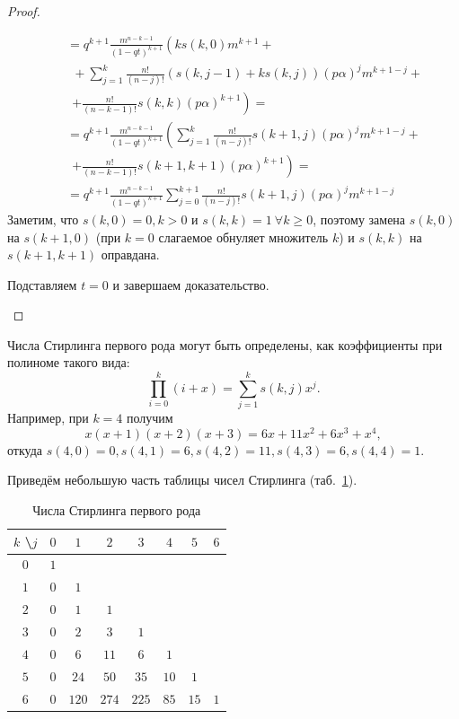 \documentclass[12pt, specialist, subf, substylefile = spbu.rtx]{disser}
\begin{document}
\begin{proof}
\begin{enumerate}
\[\begin{aligned}
					&\quad= q ^{k + 1} \frac {m ^{n - k - 1}} {(1 - qt) ^{k + 1}} \left(k s(k, 0) m ^{k + 1} +\right.\\
					&\quad~~ + \sum \limits ^k _{j = 1} \frac {n !} {(n - j)!} (s(k, j - 1) + k s(k, j)) (p \alpha) ^j m ^{k + 1 - j} +\\
					&\quad~~ \left. +\frac {n !} {(n - k - 1)!} s(k, k) (p \alpha) ^{k + 1}\right)=\\
					&\quad= q ^{k + 1} \frac {m ^{n - k - 1}} {(1 - qt) ^{k + 1}} \left(\sum \limits ^k _{j = 1} \frac {n !} {(n - j)!} s(k + 1, j) (p \alpha) ^j m ^{k + 1 - j} + \right.\\
					&\quad~~ \left. +\frac {n !} {(n - k - 1)!} s(k + 1, k + 1) (p \alpha) ^{k + 1}\right)=\\
					&\quad= q ^{k + 1} \frac {m ^{n - k - 1}} {(1 - qt) ^{k + 1}} \sum \limits ^{k + 1} _{j = 0} \frac {n !} {(n - j)!} s(k + 1, j) (p \alpha) ^j m ^{k + 1 - j}
				\end{aligned}
			\]
			Заметим, что $s(k, 0) = 0, k > 0$ и $s(k, k) = 1~ \forall k \geqslant 0$, поэтому замена $s(k, 0)$ на $s(k + 1, 0)$ (при $k = 0$ слагаемое обнуляет множитель $k$) и $s(k, k)$ на $s(k + 1, k + 1)$ оправдана.
			
			Подставляем $t = 0$ и завершаем доказательство.
		\end{enumerate}
	\end{proof}

	Числа Стирлинга первого рода могут быть определены, как коэффициенты при полиноме такого вида:
	\[
		\prod \limits ^k _{i = 0} (i + x) = \sum \limits ^k _{j = 1} s(k, j) x ^j.
	\]
	Например, при $ k = 4 $ получим
	\[
		x(x + 1)(x + 2)(x + 3) = 6x + 11x ^2 + 6x ^3 + x ^4,
	\]
	откуда $ s(4, 0) = 0, s(4, 1) = 6, s(4, 2) = 11, s(4, 3) = 6, s(4, 4) = 1 $. 
	
	Приведём небольшую часть таблицы чисел Стирлинга (таб.~\ref{tab:stirling1}).
	\begin{table}[!h]
		\centering
		\caption{Числа Стирлинга первого рода}
		\begin{tabular}{c|ccccccc}
			$k$ \textbackslash $j$ & $0$ & $1$ & $2$ & $3$ & $4$ & $5$ & $6$\\ \hline
			$0$ & $1$ &  &  &  &  &  & \\
			$1$ & $0$ & $1$ &  &  &  &  & \\
			$2$ & $0$ & $1$ & $1$ &  &  &  & \\
			$3$ & $0$ & $2$ & $3$ & $1$ &  &  & \\
			$4$ & $0$ & $6$ & $11$ & $6$ & $1$ &  & \\
			$5$ & $0$ & $24$ & $50$ & $35$ & $10$ & $1$ & \\
			$6$ & $0$ & $120$ & $274$ & $225$ & $85$ & $15$ & $1$\\
		\end{tabular}
		\label{tab:stirling1}
	\end{table}
	
\end{document}
